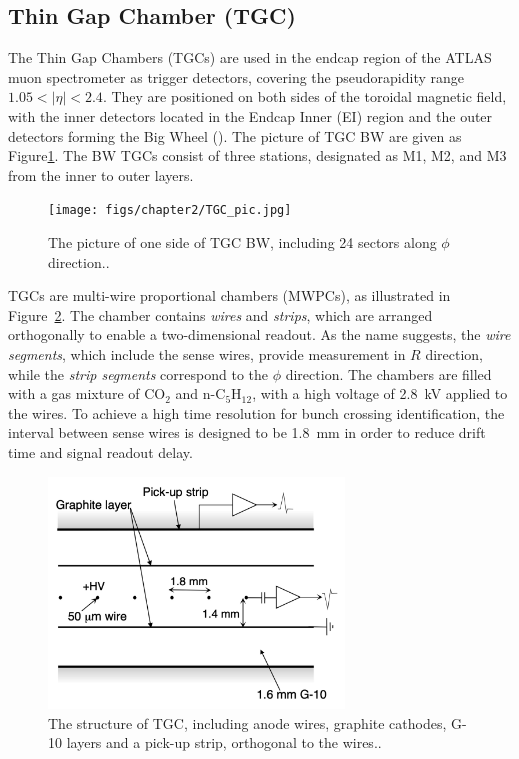 \subsection{Thin Gap Chamber (TGC)} \label{sec:TGC}
The Thin Gap Chambers (TGCs) are used in the endcap region of the ATLAS muon spectrometer as trigger detectors, covering the pseudorapidity range $1.05 < |\eta| < 2.4$. They are positioned on both sides of the toroidal magnetic field, with the inner detectors located in the Endcap Inner (EI) region and the outer detectors forming the Big Wheel (\BW). The picture of TGC BW are given as Figure\ref{fig:TGC_pic}. The BW TGCs consist of three stations, designated as M1, M2, and M3 from the inner to outer layers.

\begin{figure}[htbp]
  \centering
  \texttt{[image: figs/chapter2/TGC\_pic.jpg]}
  \caption{The picture of one side of TGC BW, including 24 sectors along $\phi$ direction.\cite{TGCInstallation}.}
  \label{fig:TGC_pic}
\end{figure}

TGCs are multi-wire proportional chambers (MWPCs), as illustrated in Figure~\ref{fig:TGC_cross_section}. The chamber contains \textit{wires} and \textit{strips}, which are arranged orthogonally to enable a two-dimensional readout. As the name suggests, the \textit{wire segments}, which include the sense wires, provide measurement in $R$ direction, while the \textit{strip segments} correspond to the $\phi$ direction. The chambers are filled with a gas mixture of CO$_2$ and n-C$_5$H$_{12}$, with a high voltage of 2.8~kV applied to the wires. To achieve a high time resolution for bunch crossing identification, the interval between sense wires is designed to be 1.8~mm in order to reduce drift time and signal readout delay.

\begin{figure}[htbp]
  \centering
  \includegraphics[width=0.7\textwidth]{figs/chapter2/TGC_cross_section.png}
  \caption{The structure of TGC, including anode wires, graphite cathodes, G-10 layers and a pick-up strip, orthogonal to the wires.\cite{ATLASDetector2008}.}
  \label{fig:TGC_cross_section}
\end{figure}

